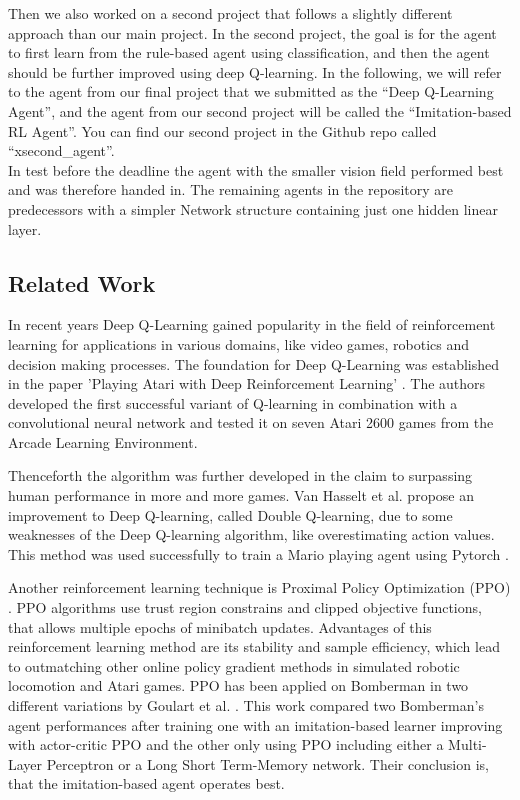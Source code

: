 \noindent Then we also worked on a second project that follows a slightly different approach than our main project. In the second project, 
the goal is for the agent to first learn from the rule-based agent using classification, and then the agent should be further improved 
using deep Q-learning. In the following, we will refer to the agent from our final project that we 
submitted as the ``Deep Q-Learning Agent'', and the agent from our second project will be called the ``Imitation-based RL Agent''.
You can find our second project in the Github repo called ``xsecond\_agent''.\\

\noindent In test before the deadline the agent with the smaller vision field performed best and was therefore handed in.
The remaining agents in the repository are predecessors with a simpler Network structure containing just one hidden linear layer.

\newpage
{}
\subsection{Related Work}

In recent years Deep Q-Learning gained popularity in the field of reinforcement learning for applications in various domains, like video games, robotics and decision making processes. The foundation for Deep Q-Learning was established in the paper 'Playing Atari with Deep Reinforcement Learning' \cite{deepRL}. The authors developed the first successful variant of Q-learning in combination with a convolutional neural network and tested it on seven Atari 2600 games from the Arcade Learning Environment.

Thenceforth the algorithm was further developed in the claim to surpassing human performance in more and more games. Van Hasselt et al. \cite{doubleQ} propose an improvement to Deep Q-learning, called Double Q-learning, due to some weaknesses of the Deep Q-learning algorithm, like overestimating action values. This method was used successfully to train a Mario playing agent using Pytorch \cite{mario}.

Another reinforcement learning technique is Proximal Policy Optimization (PPO) \cite{ppo}. PPO algorithms use trust region constrains and clipped objective functions, that allows multiple epochs of minibatch updates. Advantages of this reinforcement learning method are its stability and sample efficiency, which lead to outmatching other online policy gradient methods in simulated robotic locomotion and Atari games. PPO has been applied on Bomberman in two different variations by Goulart et al. \cite{ppobomberman}. This work compared two Bomberman's agent performances after training one with an imitation-based learner improving with actor-critic PPO and the other only using PPO including either a Multi-Layer Perceptron or a Long Short Term-Memory network. Their conclusion is, that the imitation-based agent operates best. 